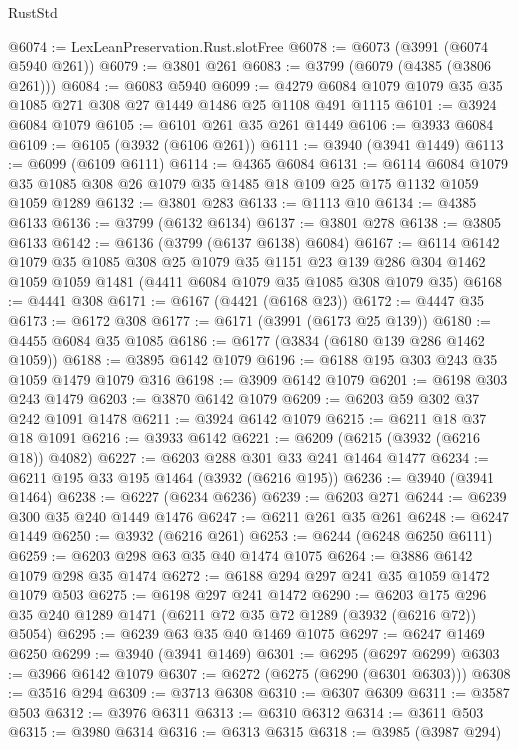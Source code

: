 \begin{lexlean}{RustStd}
\begin{coremodule}
@6074 := LexLeanPreservation.Rust.slotFree
@6078 := @6073 (@3991 (@6074 @5940 @261))
@6079 := @3801 @261
@6083 := @3799 (@6079 (@4385 (@3806 @261)))
@6084 := @6083 @5940
@6099 := @4279 @6084 @1079 @1079 @35 @35 @1085 @271 @308 @27 @1449 @1486 @25 @1108 @491 @1115
@6101 := @3924 @6084 @1079
@6105 := @6101 @261 @35 @261 @1449
@6106 := @3933 @6084
@6109 := @6105 (@3932 (@6106 @261))
@6111 := @3940 (@3941 @1449)
@6113 := @6099 (@6109 @6111)
@6114 := @4365 @6084
@6131 := @6114
    @6084
    @1079
    @35
    @1085
    @308
    @26
    @1079
    @35
    @1485
    @18
    @109
    @25
    @175
    @1132
    @1059
    @1059
    @1289
@6132 := @3801 @283
@6133 := @1113 @10
@6134 := @4385 @6133
@6136 := @3799 (@6132 @6134)
@6137 := @3801 @278
@6138 := @3805 @6133
@6142 := @6136 (@3799 (@6137 @6138) @6084)
@6167 := @6114
    @6142
    @1079
    @35
    @1085
    @308
    @25
    @1079
    @35
    @1151
    @23
    @139
    @286
    @304
    @1462
    @1059
    @1059
    @1481
    (@4411 @6084 @1079 @35 @1085 @308 @1079 @35)
@6168 := @4441 @308
@6171 := @6167 (@4421 (@6168 @23))
@6172 := @4447 @35
@6173 := @6172 @308
@6177 := @6171 (@3991 (@6173 @25 @139))
@6180 := @4455 @6084 @35 @1085
@6186 := @6177 (@3834 (@6180 @139 @286 @1462 @1059))
@6188 := @3895 @6142 @1079
@6196 := @6188 @195 @303 @243 @35 @1059 @1479 @1079 @316
@6198 := @3909 @6142 @1079
@6201 := @6198 @303 @243 @1479
@6203 := @3870 @6142 @1079
@6209 := @6203 @59 @302 @37 @242 @1091 @1478
@6211 := @3924 @6142 @1079
@6215 := @6211 @18 @37 @18 @1091
@6216 := @3933 @6142
@6221 := @6209 (@6215 (@3932 (@6216 @18)) @4082)
@6227 := @6203 @288 @301 @33 @241 @1464 @1477
@6234 := @6211 @195 @33 @195 @1464 (@3932 (@6216 @195))
@6236 := @3940 (@3941 @1464)
@6238 := @6227 (@6234 @6236)
@6239 := @6203 @271
@6244 := @6239 @300 @35 @240 @1449 @1476
@6247 := @6211 @261 @35 @261
@6248 := @6247 @1449
@6250 := @3932 (@6216 @261)
@6253 := @6244 (@6248 @6250 @6111)
@6259 := @6203 @298 @63 @35 @40 @1474 @1075
@6264 := @3886 @6142 @1079 @298 @35 @1474
@6272 := @6188 @294 @297 @241 @35 @1059 @1472 @1079 @503
@6275 := @6198 @297 @241 @1472
@6290 := @6203 @175 @296 @35 @240 @1289 @1471 (@6211 @72 @35 @72 @1289 (@3932 (@6216 @72)) @5054)
@6295 := @6239 @63 @35 @40 @1469 @1075
@6297 := @6247 @1469 @6250
@6299 := @3940 (@3941 @1469)
@6301 := @6295 (@6297 @6299)
@6303 := @3966 @6142 @1079
@6307 := @6272 (@6275 (@6290 (@6301 @6303)))
@6308 := @3516 @294
@6309 := @3713 @6308
@6310 := @6307 @6309
@6311 := @3587 @503
@6312 := @3976 @6311
@6313 := @6310 @6312
@6314 := @3611 @503
@6315 := @3980 @6314
@6316 := @6313 @6315
@6318 := @3985 (@3987 @294)

\end{coremodule}
\end{lexlean}
